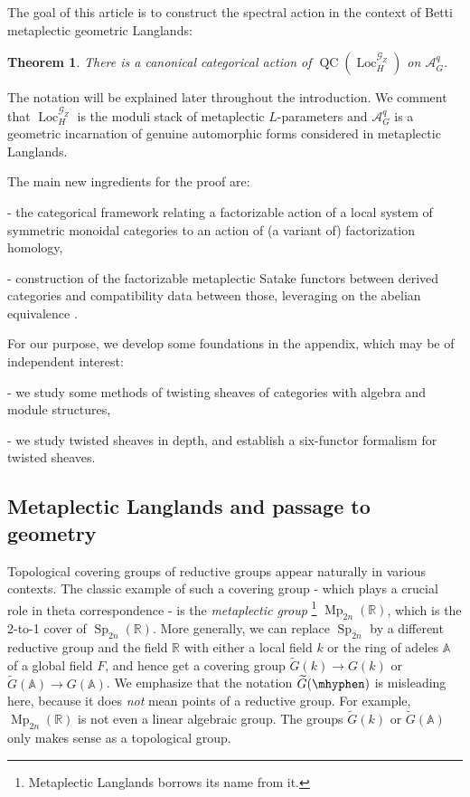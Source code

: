 \documentclass[10pt]{amsart}
\newtheorem{thm}[subsubsection]{Theorem}
\theoremstyle{remark}
\newcommand{\wt}{\widetilde}
\newcommand{\R}{\mathbb{R}}
\newcommand{\on}{\operatorname}
\newcommand{\cA}{\mathcal{A}}
\newcommand{\cG}{\mathcal{G}}
\newcommand{\QC}{\on{QC}}
\newcommand{\Loc}{\on{Loc}}
\begin{document}
The goal of this article is to construct the spectral action in the context of Betti metaplectic geometric Langlands: 
\begin{thm}\label{thm: main}
    There is a canonical categorical action of $\QC(\Loc^{\cG_Z}_H)$ on $\cA^q_G$.
\end{thm}
The notation will be explained later throughout the introduction. We comment that $\Loc^{\cG_Z}_H$ is the moduli stack of metaplectic $L$-parameters and $\cA^q_G$ is a geometric incarnation of genuine automorphic forms considered in metaplectic Langlands.
\medskip

The main new ingredients for the proof are:

- the categorical framework relating a factorizable action of a local system of symmetric monoidal categories to an action of (a variant of) factorization homology,

- construction of the factorizable metaplectic Satake functors between derived categories and compatibility data between those, leveraging on the abelian equivalence \cite{Rei, ZhaoNew}.
\medskip

For our purpose, we develop some foundations in the appendix, which may be of independent interest:

- we study some methods of twisting sheaves of categories with algebra and module structures,

- we study twisted sheaves in depth, and establish a six-functor formalism for twisted sheaves.

\subsection{Metaplectic Langlands and passage to geometry}
Topological covering groups of reductive groups appear naturally in various contexts. The classic example of such a covering group - which plays a crucial role in theta correspondence - is the \emph{metaplectic group} \footnote{Metaplectic Langlands borrows its name from it.} $\on{Mp}_{2n}(\R)$, which is the 2-to-1 cover of $\on{Sp}_{2n}(\R)$. More generally, we can replace $\on{Sp}_{2n}$ by a different reductive group and the field $\R$ with either a local field $k$ or the ring of adeles $\mathbb{A}$ of a global field $F$, and hence get a covering group $\wt{G}(k)\rightarrow G(k)$ or $\wt{G}(\mathbb{A})\rightarrow G(\mathbb{A})$. We emphasize that the notation $\wt{G}(\mhyphen)$ is misleading here, because it does \emph{not} mean points of a reductive group. For example, $\on{Mp}_{2n}(\R)$ is not even a linear algebraic group. The groups $\wt{G}(k)$ or $\wt{G}(\mathbb{A})$ only makes sense as a topological group.
\end{document}
